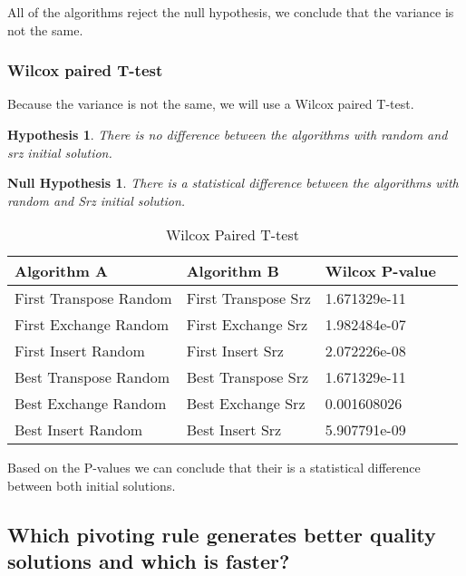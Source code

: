\documentclass[]{article}
\newtheorem{hypothesis}{Hypothesis}
\newtheorem{nullhypothesis}{Null Hypothesis}
\begin{document}
	All of the algorithms reject the null hypothesis, we conclude that the variance is not the same.
	
	
	\subsubsection{Wilcox paired T-test}
	Because the variance is not the same, we will use a Wilcox paired T-test.
	\begin{hypothesis}There is no difference between the algorithms with random and srz initial solution.\end{hypothesis}
	\begin{nullhypothesis}There is a statistical difference between the algorithms with random and Srz initial solution.\end{nullhypothesis}
	
	\begin{table}[H]
		\centering
		\caption{Wilcox Paired T-test }
		\label{tab:table1}
		\begin{tabular}{ll{|}ll}
			\toprule
			Algorithm A& Algorithm B & Wilcox P-value\\
			\midrule
			First Transpose Random &First Transpose Srz&\color{OliveGreen}1.671329e-11\\ 
			First Exchange Random  &First Exchange Srz&\color{OliveGreen}1.982484e-07\\ 
			First Insert Random 	&First Insert Srz&\color{OliveGreen}2.072226e-08\\  
			Best Transpose Random &Best Transpose Srz&\color{OliveGreen}1.671329e-11\\  
			Best Exchange Random  &Best Exchange Srz&\color{OliveGreen}0.001608026\\ 
			Best Insert Random 	&Best Insert Srz&\color{OliveGreen}5.907791e-09\\ 	
			\bottomrule
		\end{tabular}
	\end{table}
	
	Based on the P-values we can conclude that their is a statistical difference between both initial solutions.
	
	
	
	
	
	
	
	\subsection{Which pivoting rule generates better quality solutions and which is faster?}
	
\end{document}

